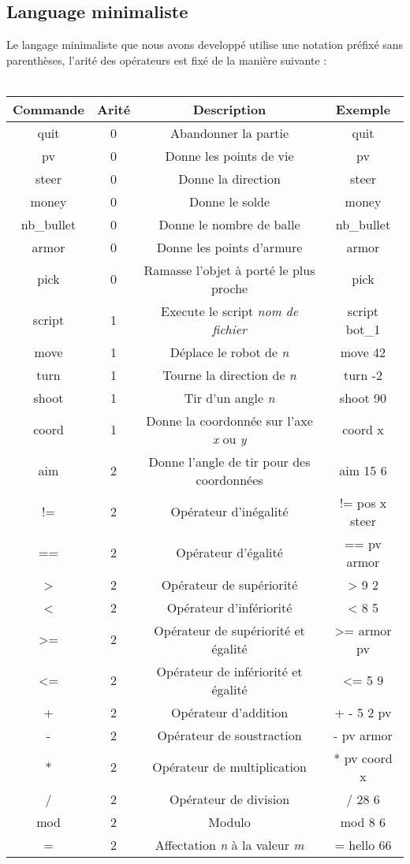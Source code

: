 \documentclass[a4paper, 11pt]{article}
\begin{document}
\subsection{Language minimaliste}
Le langage minimaliste que nous avons developpé utilise une notation préfixé sans parenthèses, l'arité des opérateurs est fixé de la manière suivante :\\\\
\begin{tabular}{|c|c|c|c|}
   \hline
   Commande & Arité & Description & Exemple \\
	 \hline
   quit & 0 & Abandonner la partie & quit \\
   \hline
   pv & 0 & Donne les points de vie & pv \\
   \hline
	 steer & 0 & Donne la direction & steer \\
	 \hline
   money & 0 & Donne le solde & money \\
   \hline
   nb\_bullet & 0 & Donne le nombre de balle & nb\_bullet \\
   \hline
	 armor & 0 & Donne les points d'armure & armor \\
	 \hline
	 pick & 0 & Ramasse l'objet à porté le plus proche & pick \\
   \hline
	 script & 1 & Execute le script \emph{nom de fichier} & script bot\_1 \\
   \hline
   move & 1 & Déplace le robot de \emph{n} & move 42 \\
   \hline
	 turn & 1 & Tourne la direction de \emph{n} & turn -2 \\
	 \hline
   shoot & 1 & Tir d'un angle \emph{n} & shoot 90 \\
   \hline
   coord & 1 & Donne la coordonnée sur l'axe \emph{x} ou \emph{y} & coord x \\
   \hline
	 aim & 2 & Donne l'angle de tir pour des coordonnées & aim 15 6 \\
   \hline
	 != & 2 & Opérateur d'inégalité & != pos x steer \\
	 \hline
   == & 2 & Opérateur d'égalité  & == pv armor \\
   \hline
   > & 2 & Opérateur de supériorité  & > 9 2 \\
   \hline
	 < & 2 & Opérateur d'infériorité  & < 8 5 \\
	 \hline
   >= & 2 & Opérateur de supériorité et égalité  & >= armor pv \\
   \hline
   <= & 2 & Opérateur de infériorité et égalité  & <= 5 9 \\
   \hline
	 + & 2 & Opérateur d'addition & + - 5 2 pv \\
	 \hline
   - & 2 & Opérateur de soustraction & - pv armor \\
   \hline
   * & 2 & Opérateur de multiplication & * pv coord x \\
   \hline
	 / & 2 & Opérateur de division & / 28 6 \\
	 \hline
   mod & 2 & Modulo & mod 8 6 \\
   \hline
   = & 2 & Affectation \emph{n} à la valeur \emph{m}  & = hello 66 \\
   \hline
\end{tabular}
\end{document}
